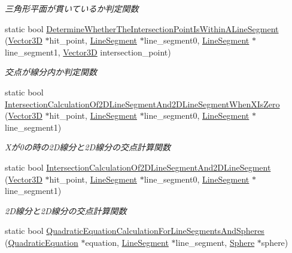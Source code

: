 \begin{DoxyCompactItemize}
\begin{DoxyCompactList}\small\item\em 三角形平面が貫いているか判定関数 \end{DoxyCompactList}\item 
static bool \mbox{\hyperlink{class_collision_calculation_a286f406988ba6ca8d46460fabba14fd6}{Determine\+Whether\+The\+Intersection\+Point\+Is\+Within\+A\+Line\+Segment}} (\mbox{\hyperlink{class_vector3_d}{Vector3D}} $\ast$hit\+\_\+point, \mbox{\hyperlink{class_line_segment}{Line\+Segment}} $\ast$line\+\_\+segment0, \mbox{\hyperlink{class_line_segment}{Line\+Segment}} $\ast$line\+\_\+segment1, \mbox{\hyperlink{class_vector3_d}{Vector3D}} intersection\+\_\+point)
\begin{DoxyCompactList}\small\item\em 交点が線分内か判定関数 \end{DoxyCompactList}\item 
static bool \mbox{\hyperlink{class_collision_calculation_a95ba95163806f128280a825cf4517336}{Intersection\+Calculation\+Of2\+D\+Line\+Segment\+And2\+D\+Line\+Segment\+When\+X\+Is\+Zero}} (\mbox{\hyperlink{class_vector3_d}{Vector3D}} $\ast$hit\+\_\+point, \mbox{\hyperlink{class_line_segment}{Line\+Segment}} $\ast$line\+\_\+segment0, \mbox{\hyperlink{class_line_segment}{Line\+Segment}} $\ast$line\+\_\+segment1)
\begin{DoxyCompactList}\small\item\em Xが0の時の2\+D線分と2\+D線分の交点計算関数 \end{DoxyCompactList}\item 
static bool \mbox{\hyperlink{class_collision_calculation_a01b7e084c9517b5f1e2e724b1212e4c6}{Intersection\+Calculation\+Of2\+D\+Line\+Segment\+And2\+D\+Line\+Segment}} (\mbox{\hyperlink{class_vector3_d}{Vector3D}} $\ast$hit\+\_\+point, \mbox{\hyperlink{class_line_segment}{Line\+Segment}} $\ast$line\+\_\+segment0, \mbox{\hyperlink{class_line_segment}{Line\+Segment}} $\ast$line\+\_\+segment1)
\begin{DoxyCompactList}\small\item\em 2\+D線分と2\+D線分の交点計算関数 \end{DoxyCompactList}\item 
static bool \mbox{\hyperlink{class_collision_calculation_abb04e8dc678bf1bcb0f1ecc8dd9edcca}{Quadratic\+Equation\+Calculation\+For\+Line\+Segments\+And\+Spheres}} (\mbox{\hyperlink{class_quadratic_equation}{Quadratic\+Equation}} $\ast$equation, \mbox{\hyperlink{class_line_segment}{Line\+Segment}} $\ast$line\+\_\+segment, \mbox{\hyperlink{class_sphere}{Sphere}} $\ast$sphere)

\end{DoxyCompactItemize}
